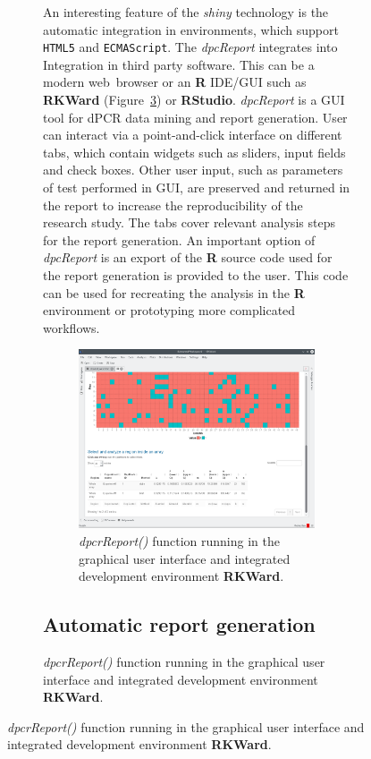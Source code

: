 \documentclass[a4,center,fleqn]{NAR}
\begin{document}
\begin{figure}[t]
\begin{figure}[t]
An interesting feature of the \textit{shiny} 
technology is the automatic integration in environments, which support 
\texttt{HTML5} and \texttt{ECMAScript}. The \textit{dpcReport} integrates into 
Integration in third party software. This can be a modern web~browser or an 
\textbf{R} IDE/GUI such as \textbf{RKWard} (Figure~\ref{GUI_RKWard_1}) 
\cite{rodiger_rkward_2012} or \textbf{RStudio}. \textit{dpcReport} is a GUI tool 
for dPCR data mining and report generation. User can interact via a 
point-and-click interface on different tabs, which contain widgets such as 
sliders, input fields and check boxes. Other 
user input, such as parameters of test performed in GUI, are preserved and 
returned in the report to increase the reproducibility of the research study. 
The tabs cover relevant analysis steps for the report generation. An important 
option of \textit{dpcReport} is an export of the \textbf{R} source code used for 
the report generation is provided to the user. This code can be used for 
recreating the analysis in the \textbf{R} environment or prototyping more 
complicated workflows.


\begin{figure}[t]
\begin{center}
\includegraphics[width=17cm]{GUI_RKWard_1.png}
\end{center}
\caption{\textit{dpcrReport()} function running in the graphical user interface and integrated development environment \textbf{RKWard}.}
\label{GUI_RKWard_1}
\end{figure}

\subsection{Automatic report generation}


\end{figure}
\end{figure}
\end{document}
